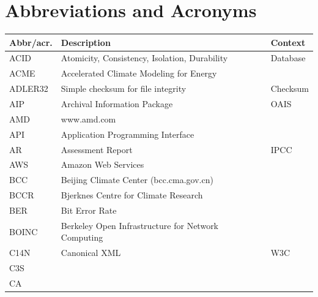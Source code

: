 \documentclass{../../template/esiwace-report}
\begin{document}
\appendix


\chapter{Abbreviations and Acronyms}
\label{sec:abbrev}
\setlongtables
\scriptsize
\begin{longtable}{|l|l|l|}
  \hline
  Abbr/acr.	&	Description	        		&	Context                         \\
  \hline
  ACID	&	Atomicity, Consistency, Isolation, Durability	&	Database                        \\
  ACME        &	Accelerated Climate Modeling for Energy		&                                       \\
  ADLER32     &	Simple checksum for file integrity		&                           Checksum    \\
  AIP         &	Archival Information Package			&	OAIS                            \\
  AMD         &	www.amd.com                                     &                                       \\
  API         &	Application Programming Interface		&                                       \\
  AR          &	Assessment Report       			&	IPCC                            \\
  AWS         &	Amazon Web Services                             &                                       \\
  BCC         &	Beijing Climate Center (bcc.cma.gov.cn)         &                                       \\
  BCCR        &	Bjerknes Centre for Climate Research            &                                       \\
  BER         &	Bit Error Rate                                  &                                       \\
  BOINC       &	Berkeley Open Infrastructure for Network Computing      &                               \\
  C14N        &         Canonical XML                                 &         W3C                           \\
  C3S         &                                                       &                                       \\
  CA          &                                                       &                                       \\

\end{longtable}
\end{document}
